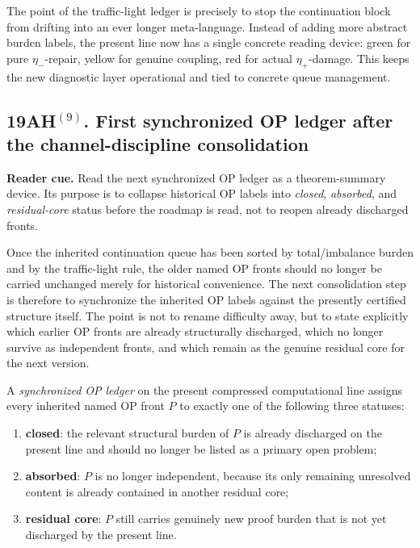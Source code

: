 \begin{remark}
The point of the traffic-light ledger is precisely to stop the continuation block from drifting into an ever longer meta-language. Instead of adding more abstract burden labels, the present line now has a single concrete reading device: green for pure \(\eta_-\)-repair, yellow for genuine coupling, red for actual \(\eta_+\)-damage. This keeps the new diagnostic layer operational and tied to concrete queue management.
\end{remark}

\subsection*{19AH$^{(9)}$. First synchronized OP ledger after the channel-discipline consolidation}
\noindent\textbf{Reader cue.} Read the next synchronized OP ledger as a theorem-summary device. Its purpose is to collapse historical OP labels into \emph{closed}, \emph{absorbed}, and \emph{residual-core} status before the roadmap is read, not to reopen already discharged fronts.

Once the inherited continuation queue has been sorted by total/imbalance burden and by the traffic-light rule, the older named OP fronts should no longer be carried unchanged merely for historical convenience. The next consolidation step is therefore to synchronize the inherited OP labels against the presently certified structure itself. The point is not to rename difficulty away, but to state explicitly which earlier OP fronts are already structurally discharged, which no longer survive as independent fronts, and which remain as the genuine residual core for the next version.

\begin{definition}
A \emph{synchronized OP ledger} on the present compressed computational line assigns every inherited named OP front \(P\) to exactly one of the following three statuses:
\begin{enumerate}[leftmargin=2em]
 \item \textbf{closed}: the relevant structural burden of \(P\) is already discharged on the present line and should no longer be listed as a primary open problem;
 \item \textbf{absorbed}: \(P\) is no longer independent, because its only remaining unresolved content is already contained in another residual core;
 \item \textbf{residual core}: \(P\) still carries genuinely new proof burden that is not yet discharged by the present line.
\end{enumerate}
\end{definition}

